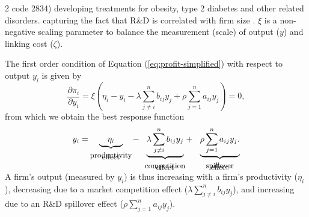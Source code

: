 \documentclass[12pt]{article}
\begin{document}
\begin{spacing}{2}
{code 2834) developing treatments for obesity, type 2 diabetes and other
related disorders.} capturing the fact that R\&D is correlated with firm size \citep{cohen96:_firm_size_and_natur_of, cohen96:_repris_of_size_and_r_d}. $\xi$ is a non-negative scaling parameter to balance the measurement (scale) of output ($y$) and linking cost ($\zeta$). %

The first order condition of Equation (\ref{eq:profit-simplified}) with respect to output $y_i$ is given by
\begin{equation}
\frac{\partial \pi_i}{\partial y_i} =
\xi\left( \eta_i - y_i
- \lambda \sum_{j \ne i}^n b_{ij} y_j
+ \rho \sum_{j=1}^n a_{ij} y_j \right) =0,
\label{eq:profit-foc}
\end{equation}
from which we obtain the best response function
\begin{equation}
y_i =
\hspace{-0.2cm}
\underbrace{\phantom{qq} \eta_i \phantom{qq}}_{
\begin{array}{c}
\vspace{-0.35cm} \small \text{productivity} \\
\vspace{-0.35cm} \small \text{effect}
\end{array}
}  
\hspace{-0.2cm}
- 
\underbrace{ \lambda \sum_{j \ne i}^n b_{ij} y_j}_{
\begin{array}{c}
\vspace{-0.35cm} \small \text{competition} \\
\vspace{-0.35cm} \small \text{effect}
\end{array}
}
\hspace{-0.2cm}
+ 
\hspace{0.25cm}
\underbrace{ \rho \sum_{j=1}^n a_{ij} y_j.}_{
\begin{array}{c}
\vspace{-0.35cm} \small \text{spillover} \\
\vspace{-0.35cm} \small \text{effect}
\end{array}}
\label{eq:output-br}
\end{equation}
A firm's output (measured by $y_i$) is thus increasing with a firm's productivity ($\eta_i$), decreasing due to a market competition effect ($\lambda \sum_{j \ne i}^n b_{ij} y_j$), and increasing due to an R\&D spillover effect ($\rho \sum_{j=1}^n a_{ij} y_j$). %

\end{spacing}
\end{document}
